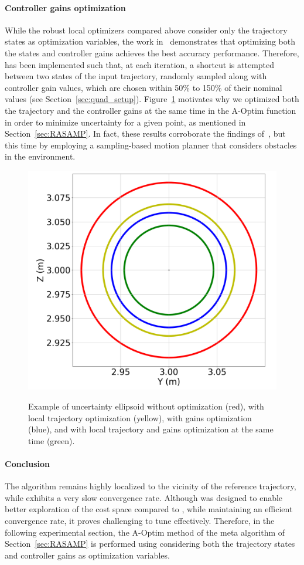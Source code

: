 \paragraph{Controller gains optimization}

While the robust local optimizers compared above consider only the trajectory states as optimization variables, the work in~\cite{AliIROS} demonstrates that optimizing both the states and controller gains achieves the best accuracy performance.
Therefore,  has been implemented such that, at each iteration, a shortcut is attempted between two states of the input trajectory, randomly sampled along with controller gain values, which are chosen within 50\% to 150\% of their nominal values (see Section~\ref{sec:quad_setup}).
Figure~\ref{fig: Acc opti} motivates why we optimized both the trajectory and the controller gains at the same time in the A-Optim function in order to minimize uncertainty for a given point, as mentioned in Section~\ref{sec:RASAMP}. 
In fact, these results corroborate the findings of~\cite{AliIROS}, but this time by employing a sampling-based motion planner that considers obstacles in the environment.

\begin{figure} [htp]
    \centering
    {\includegraphics[width=0.5\linewidth]{figures/robust_accurate/accuracy_opti.png} }%
    \caption{Example of uncertainty ellipsoid without optimization (red), with local trajectory optimization (yellow), with gains optimization (blue), and with local trajectory and gains optimization at the same time (green).}%
    \label{fig: Acc opti}%
\end{figure}

\paragraph{Conclusion}

The  algorithm remains highly localized to the vicinity of the reference trajectory, while  exhibits a very slow convergence rate.
Although  was designed to enable better exploration of the cost space compared to , while maintaining an efficient convergence rate, it proves challenging to tune effectively.
Therefore, in the following experimental section, the A-Optim method of the meta algorithm of Section~\ref{sec:RASAMP} is performed using  considering both the trajectory states and controller gains as optimization variables.

